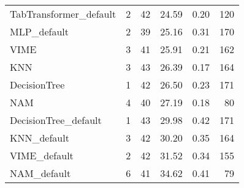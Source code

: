 \begin{tabular}{lrrrrr}
TabTransformer_default     &                  2 &  42 &  24.59 &                           0.20 &   120 \\
MLP_default                &                  2 &  39 &  25.16 &                           0.31 &   170 \\
VIME                       &                  3 &  41 &  25.91 &                           0.21 &   162 \\
KNN                        &                  3 &  43 &  26.39 &                           0.17 &   164 \\
DecisionTree               &                  1 &  42 &  26.50 &                           0.23 &   171 \\
NAM                        &                  4 &  40 &  27.19 &                           0.18 &    80 \\
DecisionTree_default       &                  1 &  43 &  29.98 &                           0.42 &   171 \\
KNN_default                &                  3 &  42 &  30.20 &                           0.35 &   164 \\
VIME_default               &                  2 &  42 &  31.52 &                           0.34 &   155 \\
NAM_default                &                  6 &  41 &  34.62 &                           0.41 &    79 \\
\bottomrule
\end{tabular}
